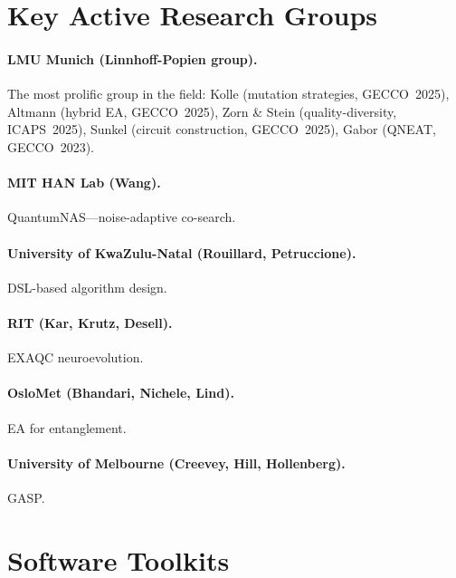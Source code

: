 \documentclass[11pt]{article}
\begin{document}
\section{Key Active Research Groups}
\label{sec:groups}

\paragraph{LMU Munich (Linnhoff-Popien group).}
The most prolific group in the field: Kolle (mutation strategies, GECCO~2025), Altmann (hybrid EA, GECCO~2025), Zorn \& Stein (quality-diversity, ICAPS~2025), Sunkel (circuit construction, GECCO~2025), Gabor (QNEAT, GECCO~2023).

\paragraph{MIT HAN Lab (Wang).} QuantumNAS---noise-adaptive co-search.

\paragraph{University of KwaZulu-Natal (Rouillard, Petruccione).} DSL-based algorithm design.

\paragraph{RIT (Kar, Krutz, Desell).} EXAQC neuroevolution.

\paragraph{OsloMet (Bhandari, Nichele, Lind).} EA for entanglement.

\paragraph{University of Melbourne (Creevey, Hill, Hollenberg).} GASP.

\section{Software Toolkits}
\label{sec:tools}
\end{document}
